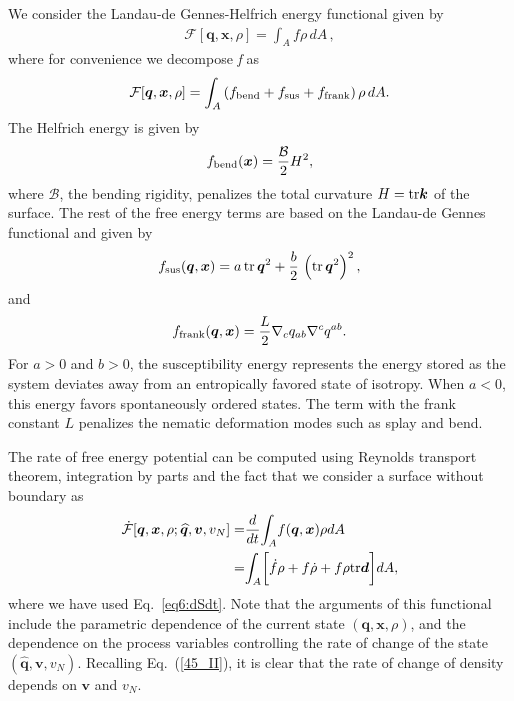 We consider the Landau-de Gennes-Helfrich energy functional given by
\begin{align} \label{33_II}
	\mathcal{F}[ \bm{q}, \bm{x}, \rho] = {\int_A} f \rho \,d A \, ,
\end{align}
where for convenience we decompose \textit{f} as
\begin{equation}  \label{33_II}
	\mathcal{F}[ \bm{q}, \bm{x}, \rho] = {\int_A} \left(f_{\rm bend} + f_{\rm sus} + f_{\rm frank}\right) \rho \,d A.
\end{equation}
The Helfrich energy is given by  
\begin{equation}  \label{34_II}
	f_{\rm bend}(\bm{x}) = \frac{ \mathcal{B} }{2} H^2,
\end{equation}
where $\mathcal{B}$, the bending rigidity, penalizes the total curvature $H = \textup{tr}\bm{k}$ of the surface. The rest of the free energy terms are based on the Landau-de Gennes functional \cite{de1993} and given by %
\begin{align}   \label{35_II}
	f_{\rm sus}(\bm{q}, \bm{x}) = {a}\, \text{tr}\,\bm{q}^2 + \frac{b}{2}\, \left(\text{tr}\,\bm{q}^2\right)^2,
\end{align}
and
\begin{align} \label{36_II}
	f_{\rm frank}(\bm{q}, \bm{x}) = \frac{L}{2}\nabla_c q_{ab} \nabla^c q^{ab}.
\end{align}
For $a>0$ and $b>0$, the susceptibility energy represents the energy stored as the system deviates away from an entropically favored state of isotropy. When $a<0$, this energy favors spontaneously ordered states. The term with the frank constant $L$ penalizes the nematic deformation modes such as splay and bend. 

The rate of free energy potential can be computed using Reynolds transport theorem, integration by parts and the fact that we consider a surface without boundary  as
\begin{align} \label{37_II}
	\dot{\mathcal{F}}[ \bm{q}, \bm{x}, \rho;  \widehat{\bm{q}}, \bm{v}, v_N]   = & \frac{d}{dt}{\int_A}  f (\bm{q}, \bm{x})  \rho d A   \nonumber \\= &  {\int_A} \bigg [  \dot f \rho +  f \dot\rho +  f \rho  {\rm tr} \bm{d}   \bigg ] d A , 
\end{align}
where we have used Eq.~\eqref{eq6:dSdt}. Note that the arguments of this functional include the parametric dependence of the current state $( \bm{q}, \bm{x}, \rho)$, and the dependence on the process variables controlling the rate of change of the state $( \widehat{\bm{q}}, \bm{v}, v_N)$. Recalling Eq.~(\ref{45_II}), it is clear that the rate of change of density depends on $\bm{v}$ and  $v_N$.

